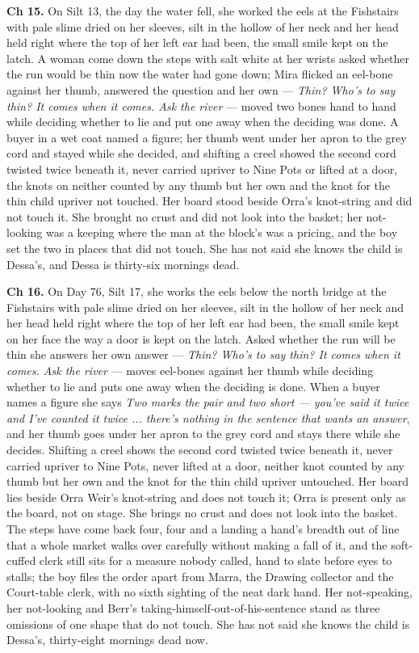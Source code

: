 \documentclass{design/chronicle}
\begin{document}
{\textbf{Ch 15.} On Silt 13, the day the water fell, she worked the eels at the Fishstairs with pale slime dried on her sleeves, silt in the hollow of her neck and her head held right where the top of her left ear had been, the small smile kept on the latch. A woman come down the steps with salt white at her wrists asked whether the run would be thin now the water had gone down; Mira flicked an eel-bone against her thumb, answered the question and her own --- \emph{Thin? Who’s to say thin? It comes when it comes. Ask the river} --- moved two bones hand to hand while deciding whether to lie and put one away when the deciding was done. A buyer in a wet coat named a figure; her thumb went under her apron to the grey cord and stayed while she decided, and shifting a creel showed the second cord twisted twice beneath it, never carried upriver to Nine Pots or lifted at a door, the knots on neither counted by any thumb but her own and the knot for the thin child upriver not touched. Her board stood beside Orra’s knot-string and did not touch it. She brought no crust and did not look into the basket; her not-looking was a keeping where the man at the block’s was a pricing, and the boy set the two in places that did not touch. She has not said she knows the child is Dessa’s, and Dessa is thirty-six mornings dead.

\textbf{Ch 16.} On Day 76, Silt 17, she works the eels below the north bridge at the Fishstairs with pale slime dried on her sleeves, silt in the hollow of her neck and her head held right where the top of her left ear had been, the small smile kept on her face the way a door is kept on the latch. Asked whether the run will be thin she answers her own answer --- \emph{Thin? Who’s to say thin? It comes when it comes. Ask the river} --- moves eel-bones against her thumb while deciding whether to lie and puts one away when the deciding is done. When a buyer names a figure she says \emph{Two marks the pair and two short --- you’ve said it twice and I’ve counted it twice ... there’s nothing in the sentence that wants an answer}, and her thumb goes under her apron to the grey cord and stays there while she decides. Shifting a creel shows the second cord twisted twice beneath it, never carried upriver to Nine Pots, never lifted at a door, neither knot counted by any thumb but her own and the knot for the thin child upriver untouched. Her board lies beside Orra Weir’s knot-string and does not touch it; Orra is present only as the board, not on stage. She brings no crust and does not look into the basket. The steps have come back four, four and a landing a hand’s breadth out of line that a whole market walks over carefully without making a fall of it, and the soft-cuffed clerk still sits for a measure nobody called, hand to slate before eyes to stalls; the boy files the order apart from Marra, the Drawing collector and the Court-table clerk, with no sixth sighting of the neat dark hand. Her not-speaking, her not-looking and Berr’s taking-himself-out-of-his-sentence stand as three omissions of one shape that do not touch. She has not said she knows the child is Dessa’s, thirty-eight mornings dead now.

}
\end{document}
